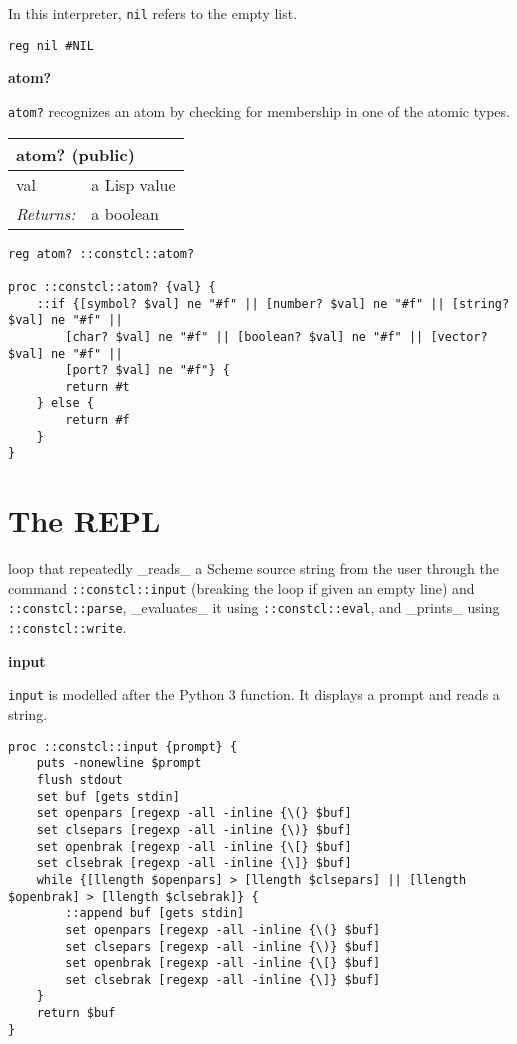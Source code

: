 \documentclass{report}
\begin{document}
In this interpreter, \texttt{nil} refers to the empty list.

\noindent\makebox[\linewidth]{\rule{\linewidth}{0.4pt}}
\begin{lstlisting}
reg nil #NIL
\end{lstlisting}
\noindent\makebox[\linewidth]{\rule{\linewidth}{0.4pt}}

\textbf{atom?}


\texttt{atom?} recognizes an atom by checking for membership in one of the atomic types.

\begin{tabular}{ |l l| }
\hline
\multicolumn{2}{|l|}{atom? (public)} \\
\hline
val & a Lisp value \\
\textit{Returns:} & a boolean \\
\hline
\end{tabular}

\noindent\makebox[\linewidth]{\rule{\linewidth}{0.4pt}}
\begin{lstlisting}
reg atom? ::constcl::atom?
 
proc ::constcl::atom? {val} {
    ::if {[symbol? $val] ne "#f" || [number? $val] ne "#f" || [string? $val] ne "#f" ||
        [char? $val] ne "#f" || [boolean? $val] ne "#f" || [vector? $val] ne "#f" ||
        [port? $val] ne "#f"} {
        return #t
    } else {
        return #f
    }
}
\end{lstlisting}
\noindent\makebox[\linewidth]{\rule{\linewidth}{0.4pt}}
\section{The REPL}
\label{the-repl}

loop that repeatedly \_reads\_ a Scheme source string from the user through the command \texttt{::constcl::input} (breaking the loop if given an empty line) and \texttt{::constcl::parse}, \_evaluates\_ it using \texttt{::constcl::eval}, and \_prints\_ using \texttt{::constcl::write}.


\textbf{input}


\texttt{input} is modelled after the Python 3 function. It displays a prompt and reads a string.

\noindent\makebox[\linewidth]{\rule{\linewidth}{0.4pt}}
\begin{lstlisting}
proc ::constcl::input {prompt} {
    puts -nonewline $prompt
    flush stdout
    set buf [gets stdin]
    set openpars [regexp -all -inline {\(} $buf]
    set clsepars [regexp -all -inline {\)} $buf]
    set openbrak [regexp -all -inline {\[} $buf]
    set clsebrak [regexp -all -inline {\]} $buf]
    while {[llength $openpars] > [llength $clsepars] || [llength $openbrak] > [llength $clsebrak]} {
        ::append buf [gets stdin]
        set openpars [regexp -all -inline {\(} $buf]
        set clsepars [regexp -all -inline {\)} $buf]
        set openbrak [regexp -all -inline {\[} $buf]
        set clsebrak [regexp -all -inline {\]} $buf]
    }
    return $buf
}
\end{lstlisting}
\noindent\makebox[\linewidth]{\rule{\linewidth}{0.4pt}}
\end{document}
